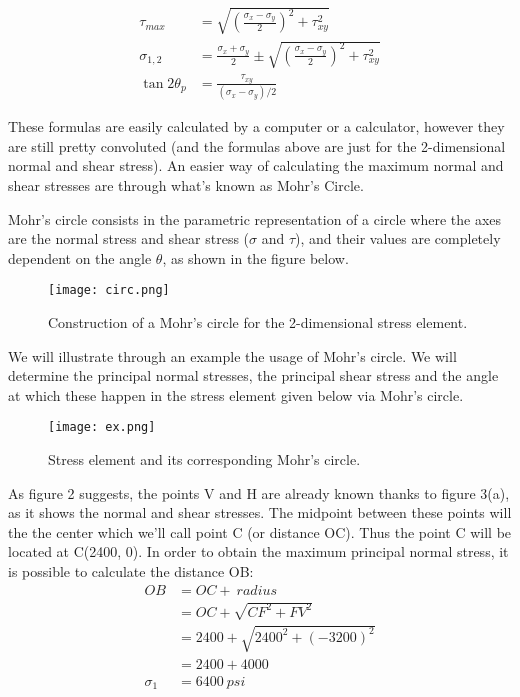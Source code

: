 \documentclass[12pt, letterpaper]{article}
\begin{document}
\begin{equation}
	\begin{split}
		\tau_{max} &= \sqrt{(\frac{\sigma_x - \sigma_y}{2})^2 + \tau_{xy}^2}\\
		\sigma_{1,2} &= \frac{\sigma_x + \sigma_y}{2} \pm \sqrt{(\frac{\sigma_x - \sigma_y}{2})^2 + \tau_{xy}^2}\\
		\tan 2\theta_p &= \frac{\tau_{xy}}{(\sigma_x - \sigma_y)/2}
	\end{split}
\end{equation}

These formulas are easily calculated by a computer or a calculator, however they are still pretty convoluted (and the formulas above are just for the 2-dimensional normal and shear stress). An easier way of calculating the maximum normal and shear stresses are through what's known as Mohr's Circle.

Mohr's circle consists in the parametric representation of a circle where the axes are the normal stress and shear stress ($\sigma$ and $\tau$), and their values are completely dependent on the angle $\theta$, as shown in the figure below.

\begin{figure}[H]
	\centering
	\texttt{[image: circ.png]}
	\caption{Construction of a Mohr's circle for the 2-dimensional stress element.}
\end{figure}

We will illustrate through an example the usage of Mohr's circle. We will determine the principal normal stresses, the principal shear stress and the angle at which these happen in the stress element given below via Mohr's circle.
\begin{figure}[H]
	\centering
	\texttt{[image: ex.png]}
	\caption{Stress element and its corresponding Mohr's circle.}
\end{figure}

As figure 2 suggests, the points V and H are already known thanks to figure 3(a), as it shows the normal and shear stresses. The midpoint between these points will the the center which we'll call point C (or distance OC). Thus the point C will be located at C(2400, 0). In order to obtain the maximum principal normal stress, it is possible to calculate the distance OB:
\begin{equation}
	\begin{split}
		OB &= OC +\ radius\\
		&= OC + \sqrt{CF^2 + FV^2}\\
		&= 2400 + \sqrt{2400^2 + (-3200)^2}\\
		&= 2400 + 4000\\
		\sigma_1 &= 6400\ psi
	\end{split}
\end{equation}
\end{document}
